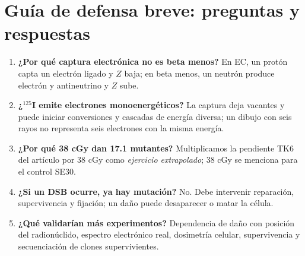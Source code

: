 \documentclass[11pt,a4paper]{article}
\begin{document}
\appendix\section{Guía de defensa breve: preguntas y respuestas}
\begin{enumerate}[leftmargin=*]
\item \textbf{¿Por qué captura electrónica no es beta menos?} En EC, un protón capta un electrón ligado y $Z$ baja; en beta menos, un neutrón produce electrón y antineutrino y $Z$ sube.
\item \textbf{¿$^{125}$I emite electrones monoenergéticos?} La captura deja vacantes y puede iniciar conversiones y cascadas de energía diversa; un dibujo con seis rayos no representa seis electrones con la misma energía.
\item \textbf{¿Por qué 38 cGy dan 17.1 mutantes?} Multiplicamos la pendiente TK6 del artículo por 38 cGy como \emph{ejercicio extrapolado}; 38 cGy se menciona para el control SE30.
\item \textbf{¿Si un DSB ocurre, ya hay mutación?} No. Debe intervenir reparación, supervivencia y fijación; un daño puede desaparecer o matar la célula.
\item \textbf{¿Qué validarían más experimentos?} Dependencia de daño con posición del radionúclido, espectro electrónico real, dosimetría celular, supervivencia y secuenciación de clones supervivientes.
\end{enumerate}
\end{document}
